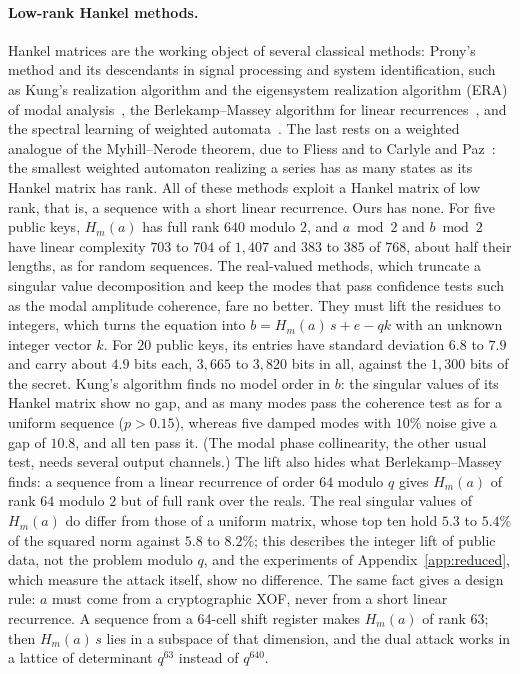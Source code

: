 \documentclass[11pt,a4paper]{article}
\theoremstyle{definition}
\begin{document}
\paragraph{Low-rank Hankel methods.} Hankel matrices are the working object of several classical methods: Prony's method and its descendants in signal processing and system identification, such as Kung's realization algorithm and the eigensystem realization algorithm (ERA) of modal analysis~\cite{kung1978svd,juang1985era}, the Berlekamp--Massey algorithm for linear recurrences~\cite{massey1969shift}, and the spectral learning of weighted automata~\cite{balle2014spectral}. The last rests on a weighted analogue of the Myhill--Nerode theorem, due to Fliess and to Carlyle and Paz~\cite{fliess1974hankel,carlyle1971realizations}: the smallest weighted automaton realizing a series has as many states as its Hankel matrix has rank. All of these methods exploit a Hankel matrix of low rank, that is, a sequence with a short linear recurrence. Ours has none. For five public keys, $H_m(a)$ has full rank $640$ modulo $2$, and $a \bmod 2$ and $b \bmod 2$ have linear complexity $703$ to $704$ of $1{,}407$ and $383$ to $385$ of $768$, about half their lengths, as for random sequences. The real-valued methods, which truncate a singular value decomposition and keep the modes that pass confidence tests such as the modal amplitude coherence, fare no better. They must lift the residues to integers, which turns the equation into $b = H_m(a)\,s + e - qk$ with an unknown integer vector $k$. For $20$ public keys, its entries have standard deviation $6.8$ to $7.9$ and carry about $4.9$ bits each, $3{,}665$ to $3{,}820$ bits in all, against the $1{,}300$ bits of the secret. Kung's algorithm finds no model order in $b$: the singular values of its Hankel matrix show no gap, and as many modes pass the coherence test as for a uniform sequence ($p > 0.15$), whereas five damped modes with $10\%$ noise give a gap of $10.8$, and all ten pass it. (The modal phase collinearity, the other usual test, needs several output channels.) The lift also hides what Berlekamp--Massey finds: a sequence from a linear recurrence of order $64$ modulo $q$ gives $H_m(a)$ of rank $64$ modulo $2$ but of full rank over the reals. The real singular values of $H_m(a)$ do differ from those of a uniform matrix, whose top ten hold $5.3$ to $5.4\%$ of the squared norm against $5.8$ to $8.2\%$; this describes the integer lift of public data, not the problem modulo $q$, and the experiments of Appendix~\ref{app:reduced}, which measure the attack itself, show no difference. The same fact gives a design rule: $a$ must come from a cryptographic XOF, never from a short linear recurrence. A sequence from a 64-cell shift register makes $H_m(a)$ of rank $63$; then $H_m(a)\,s$ lies in a subspace of that dimension, and the dual attack works in a lattice of determinant $q^{63}$ instead of $q^{640}$.
\end{document}
